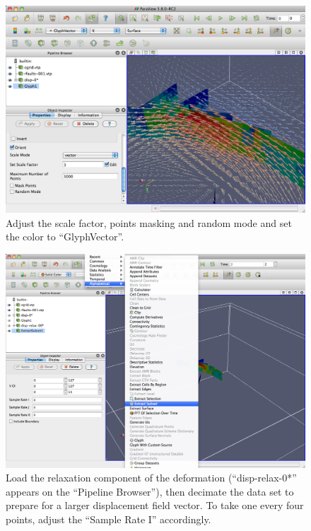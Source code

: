 \documentclass[10pt]{article}
\begin{document}
%
\begin{figure}
\begin{center}
\includegraphics[width=\textwidth]{paraview-disp-2.png}
\end{center}
\small
\caption{Adjust the scale factor, points masking and random mode and set the color to ``GlyphVector''.}
\label{fig:disp-2}
\end{figure}
%

%
\begin{figure}
\begin{center}
\includegraphics[width=\textwidth]{paraview-extract.png}
\end{center}
\small
\caption{Load the relaxation component of the deformation (``disp-relax-0*'' appears on the ``Pipeline Browser''), then decimate the data set to prepare for a larger displacement field vector. To take one every four points, adjust the ``Sample Rate I'' accordingly.}
\label{fig:extract}
\end{figure}
%
\end{document}
